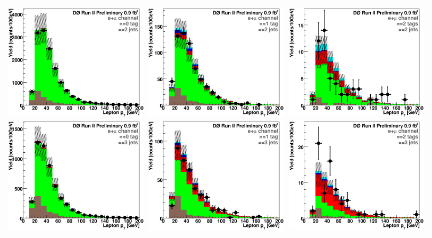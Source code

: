 \begin{figure}[!h!tbp]
\begin{center}
\includegraphics[width=0.32\textwidth]{eps/DataBackground/EMU/emu_EqZeroTag_EqTwoJet_LeptonPt.eps}
\includegraphics[width=0.32\textwidth]{eps/DataBackground/EMU/emu_EqOneTag_EqTwoJet_LeptonPt.eps}
\includegraphics[width=0.32\textwidth]{eps/DataBackground/EMU/emu_EqTwoTag_EqTwoJet_LeptonPt.eps}
\includegraphics[width=0.32\textwidth]{eps/DataBackground/EMU/emu_EqZeroTag_EqThreeJet_LeptonPt.eps}
\includegraphics[width=0.32\textwidth]{eps/DataBackground/EMU/emu_EqOneTag_EqThreeJet_LeptonPt.eps}
\includegraphics[width=0.32\textwidth]{eps/DataBackground/EMU/emu_EqTwoTag_EqThreeJet_LeptonPt.eps}

\end{center}
\end{figure}
